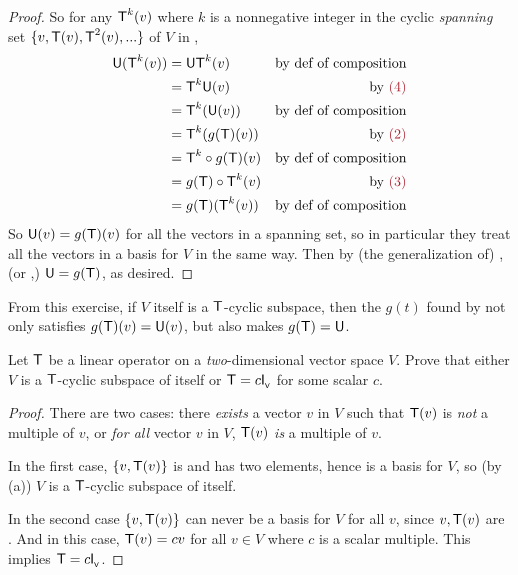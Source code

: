 \begin{proof}
So for any \(\textsf{T}^k(v)\) where \(k\) is a nonnegative integer in the cyclic \emph{spanning} set \(\{ v, \textsf{T}(v), \textsf{T}^2(v), ... \}\) of \(V\) in ,
\begin{align*}
    \U(\T^k(v))
    & = \U \T^k (v) & \text{by def of composition} \\
    & = \T^k \U (v) & \text{by \MAROON{(4)}} \\
    & = \T^k(\U(v)) & \text{by def of composition} \\
    & = \T^k(g(\T)(v)) & \text{by \MAROON{(2)}} \\
    & = \T^k \circ g(\T) (v) & \text{by def of composition} \\
    & = g(\T) \circ \T^k (v) & \text{by \MAROON{(3)}} \\
    & = g(\T) (\T^k(v)) & \text{by def of composition}
\end{align*}
So \(\textsf{U}(v) = g(\textsf{T})(v)\) for all the vectors in a spanning set, so in particular they treat all the vectors in a basis for \(V\) in the same way.
Then by (the generalization of) , (or ,) \(\textsf{U} = g(\textsf{T})\), as desired.
\end{proof}

\begin{note}
From this exercise, if \(V\) itself is a \(\textsf{T}\)-cyclic subspace, then the \(g(t)\) found by  not only satisfies \(g(\textsf{T})(v) = \textsf{U}(v)\), but also makes \(g(\textsf{T}) = \textsf{U}\).
\end{note}

\begin{exercise} \label{exercise 5.4.21}
Let \(\textsf{T}\) be a linear operator on a \emph{two}-dimensional vector space \(V\).
Prove that either \(V\) is a \(\textsf{T}\)-cyclic subspace of itself or \(\textsf{T} = c \textsf{I}_{_{\textsf{V}}}{}\) for some scalar \(c\).
\end{exercise}

\begin{proof}
There are two cases: there \emph{exists} a vector \(v\) in \(V\) such that \(\textsf{T}(v)\) is \emph{not} a multiple of \(v\),
or \emph{for all} vector \(v\) in \(V\), \(\textsf{T}(v)\) \emph{is} a multiple of \(v\).

In the first case, \(\{ v, \textsf{T}(v) \}\) is \LID{} and has two elements, hence is a basis for \(V\), so (by (a)) \(V\) is a \(\textsf{T}\)-cyclic subspace of itself.

In the second case \(\{ v, \textsf{T}(v) \}\) can never be a basis for \(V\) for all \(v\), since \(v, \textsf{T}(v)\) are \LDP{}.
And in this case, \(\textsf{T}(v) = c v\) for all \(v \in V\) where \(c\) is a scalar multiple.
This implies \(\textsf{T} = c \textsf{I}_{_{\textsf{V}}}{}\).
\end{proof}

